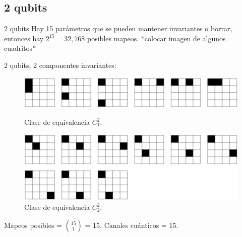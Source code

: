 \documentclass[11pt]{beamer}
\begin{document}
\subsection{2 qubits}
\begin{frame}{2 qubits}
	Hay 15 parámetros que se pueden mantener invariantes o borrar, entonces
	hay $2^{15} = 32,768$ posibles mapeos. *colocar imagen de algunos cuadritos* 
\end{frame}

\begin{frame}{2 qubits, 2 componentes invariantes:}

\begin{figure}[H]
\centering
  \begin{minipage}{0.8\textwidth}
  	\centering
    \includegraphics[width=\textwidth]{img-congreso/C12.pdf}
    \caption{Clase de equivalencia $C_1^2$.}
  \end{minipage}\vfill
  \begin{minipage}{0.8\textwidth}
  	\centering
    \includegraphics[width=\textwidth]{img-congreso/C22.pdf}
    \caption{Clase de equivalencia $C_2^2$.}
  \end{minipage}
\end{figure}\vfill
Mapeos posibles = $15 \choose 1$ = 15. Canales cuánticos = 15.

\end{frame}
\end{document}
